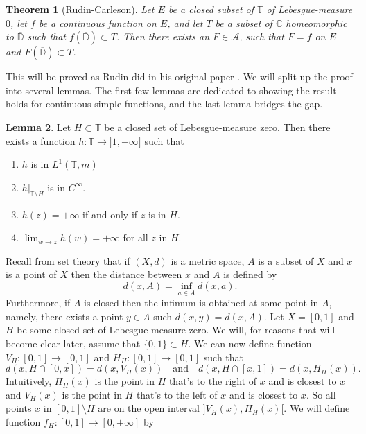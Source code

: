 \documentclass[a4paper,12pt,twoside,BCOR=10mm]{scrbook}
\newtheorem{theorem}{Theorem}[section]
\theoremstyle{definition}
\theoremstyle{definition}
\newtheorem{lemma}[theorem]{Lemma}
\theoremstyle{definition}
\begin{document}
\begin{theorem}[Rudin-Carleson]
\label{rudincarleson}
Let $E$ be a closed subset of $\mathbb{T}$ of Lebesgue-measure $0$,
	let $f$ be a continuous function on $E$,
	and let $T$ be a subset of $\mathbb{C}$ homeomorphic to $\overline{\mathbb{D}}$ such that $f(\overline{\mathbb{D}}) \subset T$.
Then there exists an $F \in \mathcal{A}$, such that $F = f$ on $E$ and $F(\overline{\mathbb{D}}) \subset T$.
\end{theorem}
This will be proved as Rudin did in his original paper \citep{rudin}.
We will split up the proof into several lemmas.
The first few lemmas are dedicated to showing the result holds for continuous simple functions, and the last lemma bridges the gap.
\begin{lemma}
\label{mylemma}
Let $H \subset \mathbb{T}$ be a closed set of Lebesgue-measure zero.
Then there exists a function $h: \mathbb{T} \rightarrow ]1, +\infty]$ such that 
\begin{enumerate}
\item
$h$ is in $L^1(\mathbb{T}, m)$
\item
$h|_{\mathbb{T} \setminus H}$ is in $C^{\infty}$.
\item
$h(z) = +\infty$ if and only if $z$ is in $H$.
\item
$\lim_{w \rightarrow z} h(w) = +\infty$ for all $z$ in $H$.
\end{enumerate}
\end{lemma}
Recall from set theory that if $(X, d)$ is a metric space, $A$ is a subset of $X$ and $x$ is a point of $X$ then the distance between $x$ and $A$ is defined by
\[
	d(x, A) = \inf_{a \in A} d(x, a).
\]
Furthermore, if $A$ is closed then the infimum is obtained at some point in $A$, namely, there exists a point $y \in A$ such $d(x, y) = d(x, A)$.
Let $X = [0, 1]$ and $H$ be some closed set of Lebesgue-measure zero.
We will, for reasons that will become clear later, assume that $\{0, 1\} \subset H$.
\label{index28}
We can now define function $V_H: [0, 1] \rightarrow [0, 1]$ and $H_H: [0, 1] \rightarrow [0, 1]$ such that
\[
	d(x, H \cap [0, x]) = d(x, V_H(x))
	\quad \text{and} \quad
	d(x, H \cap [x, 1]) = d(x, H_H(x)).
\]
Intuitively, $H_H(x)$ is the point in $H$ that's to the right of $x$ and is closest to $x$ and $V_H(x)$ is the point in $H$ that's to the left of $x$ and is closest to $x$.
So all points $x$ in $[0, 1] \setminus H$ are on the open interval $]V_H(x), H_H(x)[$.
We will define function $f_H: [0, 1] \rightarrow [0, +\infty]$ by
\end{document}
